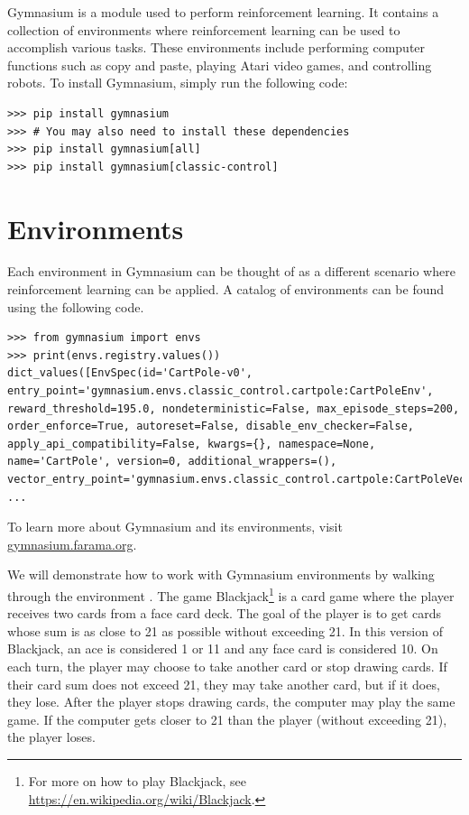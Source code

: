 

Gymnasium is a module used to perform reinforcement learning.
It contains a collection of environments where reinforcement learning can be used to accomplish various tasks.
These environments include performing computer functions such as copy and paste, playing Atari video games, and controlling robots.
To install Gymnasium, simply run the following code:
\begin{lstlisting}
>>> pip install gymnasium 
>>> # You may also need to install these dependencies
>>> pip install gymnasium[all]
>>> pip install gymnasium[classic-control]
\end{lstlisting}

\section*{Environments}

Each environment in Gymnasium can be thought of as a different scenario where reinforcement learning can be applied.
A catalog of environments can be found using the following code.

\begin{lstlisting}
>>> from gymnasium import envs
>>> print(envs.registry.values())
dict_values([EnvSpec(id='CartPole-v0', entry_point='gymnasium.envs.classic_control.cartpole:CartPoleEnv', reward_threshold=195.0, nondeterministic=False, max_episode_steps=200, order_enforce=True, autoreset=False, disable_env_checker=False, apply_api_compatibility=False, kwargs={}, namespace=None, name='CartPole', version=0, additional_wrappers=(), vector_entry_point='gymnasium.envs.classic_control.cartpole:CartPoleVectorEnv'), ...
\end{lstlisting}
To learn more about Gymnasium and its environments, visit \url{gymnasium.farama.org}.

We will demonstrate how to work with Gymnasium environments by walking through the environment .
The game Blackjack\footnote{For more on how to play Blackjack, see \url{https://en.wikipedia.org/wiki/Blackjack}.} is a card game where the player receives two cards from a face card deck.
The goal of the player is to get cards whose sum is as close to 21 as possible without exceeding 21.
In this version of Blackjack, an ace is considered 1 or 11 and any face card is considered 10.
On each turn, the player may choose to take another card or stop drawing cards.
If their card sum does not exceed 21, they may take another card, but if it does, they lose.
After the player stops drawing cards, the computer may play the same game.
If the computer gets closer to 21 than the player (without exceeding 21), the player loses.

